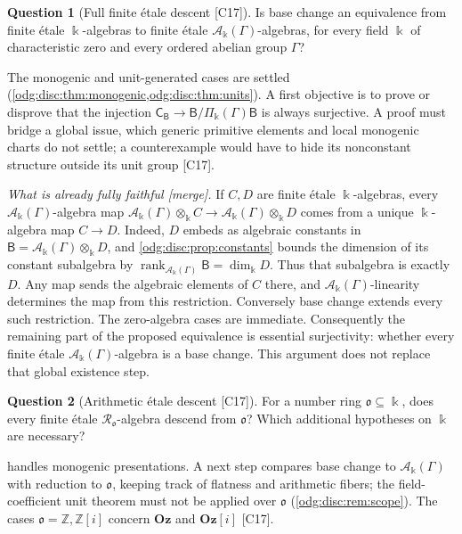 \documentclass[11pt,oneside]{article}
\numberwithin{equation}{section}
\theoremstyle{definition}
\newtheorem{question}[question]{Question}
\theoremstyle{remark}
\newcommand{\Oz}{\mathbf{Oz}}
\newcommand{\Z}{\mathbb Z}
\newcommand{\src}[1]{\textup{\textsf{\small[#1]}}}
\newcommand{\mergetag}{\textup{\textsf{\small[merge]}}}
\newcommand{\Og}{\Oz[i]}
\newcommand{\crA}{\mathcal A_\Bbbk(\Gamma)}
\newcommand{\crP}{\Pi_\Bbbk(\Gamma)}
\begin{document}
\begin{question}[Full finite \'etale descent \src{C17}]\label{odg:disc:q:etale}
Is base change an equivalence from finite \'etale $\Bbbk$-algebras to finite \'etale
$\crA$-algebras, for every field $\Bbbk$ of characteristic zero and every ordered abelian
group $\Gamma$?
\end{question}
The monogenic and unit-generated cases are settled
(\cref{odg:disc:thm:monogenic,odg:disc:thm:units}). A first objective is to prove or
disprove that the injection $\mathsf C_{\mathsf B}\to\mathsf B/\crP\mathsf B$ is always
surjective. A proof must bridge a global issue, which generic primitive elements and local
monogenic charts do not settle; a counterexample would have to hide its nonconstant
structure outside its unit group \src{C17}.

\emph{What is already fully faithful \mergetag.} If $C,D$ are finite \'etale
$\Bbbk$-algebras, every $\crA$-algebra map
$\crA\otimes_\Bbbk C\to\crA\otimes_\Bbbk D$ comes from a unique
$\Bbbk$-algebra map $C\to D$. Indeed, $D$ embeds as algebraic constants in
$\mathsf B=\crA\otimes_\Bbbk D$, and
\cref{odg:disc:prop:constants} bounds the dimension of its constant subalgebra by
$\operatorname{rank}_{\crA}\mathsf B=\dim_\Bbbk D$. Thus that subalgebra is exactly
$D$. Any map sends the algebraic elements of $C$ there, and $\crA$-linearity determines
the map from this restriction. Conversely base change extends every such restriction.
The zero-algebra cases are immediate. Consequently the remaining part of the proposed
equivalence is essential surjectivity: whether every finite \'etale $\crA$-algebra
is a base change. This argument does not replace that global existence step.

\begin{question}[Arithmetic \'etale descent \src{C17}]\label{odg:disc:q:arithmetic}
For a number ring $\mathfrak o\subseteq\Bbbk$, does every finite \'etale
$\mathcal R_{\mathfrak o}$-algebra descend from $\mathfrak o$? Which additional hypotheses
on $\Bbbk$ are necessary?
\end{question}
 handles monogenic presentations. A next step compares base
change to $\crA$ with reduction to $\mathfrak o$, keeping track of flatness and arithmetic
fibers; the field-coefficient unit theorem must not be applied over $\mathfrak o$
(\cref{odg:disc:rem:scope}). The cases $\mathfrak o=\Z,\Z[i]$ concern $\Oz$ and $\Og$
\src{C17}.
\end{document}
